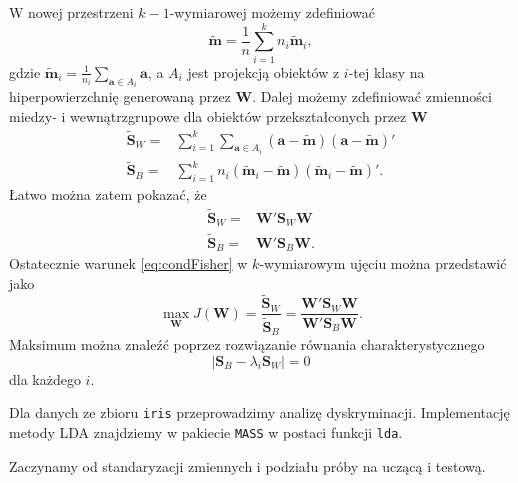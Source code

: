 \documentclass[
]{book}
\newenvironment{Shaded}{\begin{snugshade}}{\end{snugshade}}
\newcommand{\DataTypeTok}[1]{\textcolor[rgb]{0.13,0.29,0.53}{#1}}
\newcommand{\DecValTok}[1]{\textcolor[rgb]{0.00,0.00,0.81}{#1}}
\newcommand{\KeywordTok}[1]{\textcolor[rgb]{0.13,0.29,0.53}{\textbf{#1}}}
\newcommand{\NormalTok}[1]{#1}
\newcommand{\OperatorTok}[1]{\textcolor[rgb]{0.81,0.36,0.00}{\textbf{#1}}}
\newcommand{\StringTok}[1]{\textcolor[rgb]{0.31,0.60,0.02}{#1}}
\theoremstyle{plain}
\theoremstyle{definition}
\theoremstyle{definition}
\theoremstyle{definition}
\theoremstyle{definition}
\theoremstyle{remark}
\let\BeginKnitrBlock\begin \let\EndKnitrBlock\end
\begin{document}
W nowej przestrzeni \(k-1\)-wymiarowej możemy zdefiniować
\begin{equation}
    \tilde{\boldsymbol{m}}=\frac{1}{n}\sum_{i=1}^kn_i\tilde{\boldsymbol{m}}_i,
\end{equation}
gdzie \(\tilde{\boldsymbol{m}}_i= \frac{1}{n_i}\sum_{\boldsymbol{a}\in A_i}\boldsymbol{a}\), a \(A_i\) jest projekcją obiektów z \(i\)-tej klasy na hiperpowierzchnię generowaną przez \(\boldsymbol{W}\).
Dalej możemy zdefiniować zmienności miedzy- i wewnątrzgrupowe dla obiektów przekształconych przez \(\boldsymbol{W}\)
\begin{align}
    \tilde{\boldsymbol{S}}_W=&\sum_{i=1}^k\sum_{\boldsymbol{a}\in A_i}(\boldsymbol{a}-\tilde{\boldsymbol{m}})(\boldsymbol{a}-\tilde{\boldsymbol{m}})'\\
    \tilde{\boldsymbol{S}}_B=&\sum_{i=1}^kn_i(\tilde{\boldsymbol{m}}_i-\tilde{\boldsymbol{m}})(\tilde{\boldsymbol{m}}_i-\tilde{\boldsymbol{m}})'.
\end{align}
Łatwo można zatem pokazać, że
\begin{align}
    \tilde{\boldsymbol{S}}_W = & \boldsymbol{W}'\boldsymbol{S}_W\boldsymbol{W}\\
    \tilde{\boldsymbol{S}}_B = & \boldsymbol{W}'\boldsymbol{S}_B\boldsymbol{W}.
\end{align}
Ostatecznie warunek \eqref{eq:condFisher} w \(k\)-wymiarowym ujęciu można przedstawić jako
\begin{equation}
    \max_{\boldsymbol{W}}J(\boldsymbol{W})=\frac{\tilde{\boldsymbol{S}}_W}{\tilde{\boldsymbol{S}}_B}=\frac{\boldsymbol{W}'\boldsymbol{S}_W\boldsymbol{W}}{\boldsymbol{W}'\boldsymbol{S}_B\boldsymbol{W}}.
\end{equation}
Maksimum można znaleźć poprzez rozwiązanie równania charakterystycznego \begin{equation}
    |\boldsymbol{S}_B-\lambda_i\boldsymbol{S}_W|=0
\end{equation}
dla każdego \(i\).

\BeginKnitrBlock{example}
\protect\hypertarget{exm:unnamed-chunk-51}{}{\label{exm:unnamed-chunk-51} }Dla danych ze zbioru \texttt{iris} przeprowadzimy analizę dyskryminacji. Implementację metody LDA znajdziemy w pakiecie \texttt{MASS} w postaci funkcji \texttt{lda}.
\EndKnitrBlock{example}

Zaczynamy od standaryzacji zmiennych i podziału próby na uczącą i testową.

\begin{Shaded}
\end{Shaded}
\end{document}
